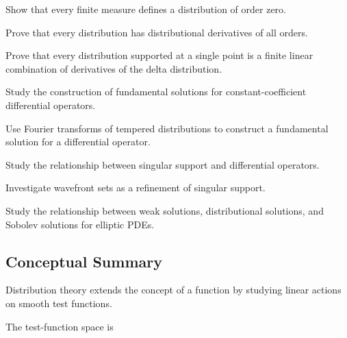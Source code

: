 \begin{exercise}[3]
Show that every finite measure defines a distribution of order zero.
\end{exercise}

\begin{exercise}[4]
Prove that every distribution has distributional derivatives of all
orders.
\end{exercise}

\begin{exercise}[4]
Prove that every distribution supported at a single point is a finite
linear combination of derivatives of the delta distribution.
\end{exercise}

\begin{exercise}[4]
Study the construction of fundamental solutions for
constant-coefficient differential operators.
\end{exercise}

\begin{exercise}[4]
Use Fourier transforms of tempered distributions to construct a
fundamental solution for a differential operator.
\end{exercise}

\begin{exercise}[4]
Study the relationship between singular support and differential
operators.
\end{exercise}

\begin{exercise}[4]
Investigate wavefront sets as a refinement of singular support.
\end{exercise}

\begin{exercise}[4]
Study the relationship between weak solutions, distributional solutions,
and Sobolev solutions for elliptic PDEs.
\end{exercise}

\subsection{Conceptual Summary}
\label{subsec:distribution-theory-summary}

Distribution theory extends the concept of a function by studying linear
actions on smooth test functions.

The test-function space is

